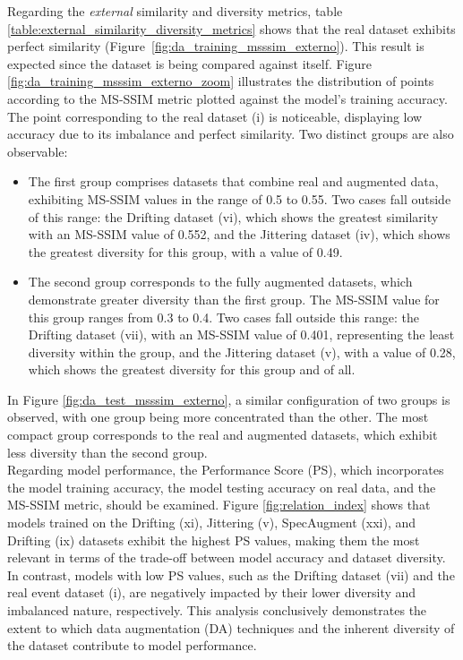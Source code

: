 \documentclass[journal]{IEEEtran}
\begin{document}
Regarding the \textit{external} similarity and diversity metrics, table \ref{table:external_similarity_diversity_metrics} shows that the real dataset exhibits perfect similarity (Figure~\ref{fig:da_training_msssim_externo}). This result is expected since the dataset is being compared against itself.
Figure \ref{fig:da_training_msssim_externo_zoom} illustrates the distribution of points according to the MS-SSIM metric plotted against the model's training accuracy. The point corresponding to the real dataset (i) is noticeable, displaying low accuracy due to its imbalance and perfect similarity. Two distinct groups are also observable:
\begin{itemize}
\item The first group comprises datasets that combine real and augmented data, exhibiting MS-SSIM values in the range of 0.5 to 0.55. Two cases fall outside of this range: the Drifting dataset (vi), which shows the greatest similarity with an MS-SSIM value of 0.552, and the Jittering dataset (iv), which shows the greatest diversity for this group, with a value of 0.49.
\item The second group corresponds to the fully augmented datasets, which demonstrate greater diversity than the first group. The MS-SSIM value for this group ranges from 0.3 to 0.4. Two cases fall outside this range: the Drifting dataset (vii), with an MS-SSIM value of 0.401, representing the least diversity within the group, and the Jittering dataset (v), with a value of 0.28, which shows the greatest diversity for this group and of all.
\end{itemize}
In Figure \ref{fig:da_test_msssim_externo}, a similar configuration of two groups is observed, with one group being more concentrated than the other. The most compact group corresponds to the real and augmented datasets, which exhibit less diversity than the second group.\\

Regarding model performance, the Performance Score (PS), which incorporates the model training accuracy, the model testing accuracy on real data, and the MS-SSIM metric, should be examined. Figure \ref{fig:relation_index} shows that models trained on the Drifting (xi), Jittering (v), SpecAugment (xxi), and Drifting (ix) datasets exhibit the highest PS values, making them the most relevant in terms of the trade-off between model accuracy and dataset diversity. In contrast, models with low PS values, such as the Drifting dataset (vii) and the real event dataset (i), are negatively impacted by their lower diversity and imbalanced nature, respectively. This analysis conclusively demonstrates the extent to which data augmentation (DA) techniques and the inherent diversity of the dataset contribute to model performance.
\end{document}
